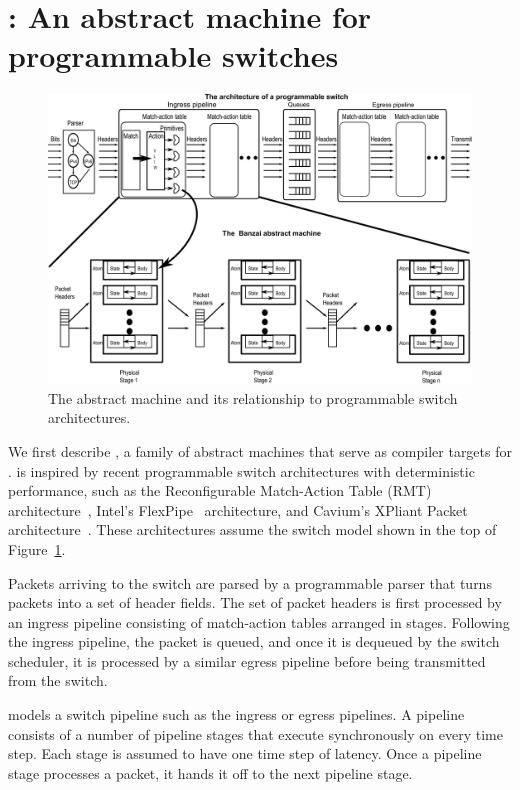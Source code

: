 \section{\absmachine: An abstract machine for programmable switches}
\label{s:absmachine}

\begin{figure}[!t]
  \includegraphics[width=\textwidth]{banzai.pdf}
  \caption{The \absmachine abstract machine and its relationship to programmable switch architectures.}
  \label{fig:switch}
\end{figure}

We first describe \absmachine, a family of abstract machines that serve as
compiler targets for \pktlanguage. \absmachine is inspired by recent
programmable switch architectures with deterministic performance, such as the
Reconfigurable Match-Action Table (RMT) architecture~\cite{rmt}, Intel's
FlexPipe~\cite{flexpipe} architecture, and Cavium's XPliant Packet
architecture~\cite{xpliant}. These architectures assume the switch model shown
in the top of Figure~\ref{fig:switch}.

Packets arriving to the switch are parsed by a programmable parser that turns
packets into a set of header fields. The set of packet headers is first
processed by an ingress pipeline consisting of match-action tables arranged in
stages. Following the ingress pipeline, the packet is queued, and once it is
dequeued by the switch scheduler, it is processed by a similar egress pipeline
before being transmitted from the switch.

\absmachine models a switch pipeline such as the ingress or egress
pipelines. A pipeline consists of a number of pipeline stages that
execute synchronously on every time step. Each stage is assumed to
have one time step of latency. Once a pipeline stage processes a
packet, it hands it off to the next pipeline stage.

